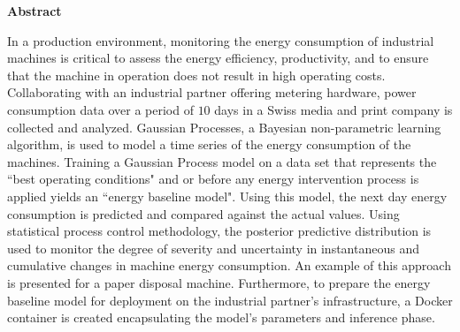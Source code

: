 \thispagestyle{plain}
\begin{center}
    \large
    \textbf{Abstract}
\end{center}

In a production environment, monitoring the energy consumption of industrial machines is critical to assess the energy efficiency, productivity, and to ensure that the machine in operation does not result in high operating costs. Collaborating with an industrial partner offering metering hardware, power consumption data over a period of $10$ days in a Swiss media and print company is collected and analyzed. Gaussian Processes, a Bayesian non-parametric learning algorithm, is used to model a time series of the energy consumption of the machines. Training a Gaussian Process model on a data set that represents the ``best operating conditions" and or before any energy intervention process is applied yields an ``energy baseline model". Using this model, the next day energy consumption is predicted and compared against the actual values. Using statistical process control methodology, the posterior predictive distribution is used to monitor the degree of severity and uncertainty in instantaneous and cumulative changes in machine energy consumption. An example of this approach is presented for a paper disposal machine. Furthermore, to prepare the energy baseline model for deployment on the industrial partner's infrastructure, a Docker container is created encapsulating the model's parameters and inference phase. 